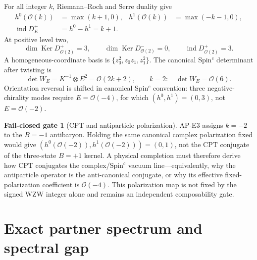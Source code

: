 \documentclass[11pt]{article}
\theoremstyle{definition}
\newtheorem{gate}[theorem]{Fail-closed gate}
\theoremstyle{remark}
\newcommand{\cO}{\mathcal O}
\newcommand{\Ker}{\operatorname{Ker}}
\newcommand{\ind}{\operatorname{ind}}
\begin{document}
For all integer \(k\), Riemann--Roch and Serre duality give
\begin{align}
 h^0(\cO(k))&=\max(k+1,0),
 &h^1(\cO(k))&=\max(-k-1,0),
 \label{eq:line-cohomology}\\
 \ind D_E^+&=h^0-h^1=k+1.
 \label{eq:rr-index}
\end{align}
At positive level two,
\begin{equation}
 \boxed{\dim\Ker D_{\cO(2)}^+=3,\qquad
 \dim\Ker D_{\cO(2)}^-=0,\qquad \ind D_{\cO(2)}^+=3.}
 \label{eq:three-states}
\end{equation}
A homogeneous-coordinate basis is
\(\{z_0^2,z_0z_1,z_1^2\}\).  The canonical Spin\({}^c\) determinant after
twisting is
\begin{equation}
 \det W_E=K^{-1}\otimes E^2=\cO(2k+2),
 \qquad k=2:\quad\det W_E=\cO(6).
 \label{eq:det-line}
\end{equation}
Orientation reversal is shifted in canonical Spin\({}^c\) convention:
three negative-chirality modes require \(E=\cO(-4)\), for which
\((h^0,h^1)=(0,3)\), not \(E=\cO(-2)\).

\begin{gate}[CPT and antiparticle polarization]
AP-E3 assigns \(k=-2\) to the \(B=-1\) antibaryon.  Holding the same
canonical complex polarization fixed would give
\((h^0(\cO(-2)),h^1(\cO(-2)))=(0,1)\), not the CPT conjugate of the
three-state \(B=+1\) kernel.  A physical completion must therefore derive how
CPT conjugates the complex/Spin\({}^c\) vacuum line---equivalently, why the
antiparticle operator is the anti-canonical conjugate, or why its effective
fixed-polarization coefficient is \(\cO(-4)\).  This polarization map is not
fixed by the signed WZW integer alone and remains an independent
composability gate.
\end{gate}

\section{Exact partner spectrum and spectral gap}
\end{document}
